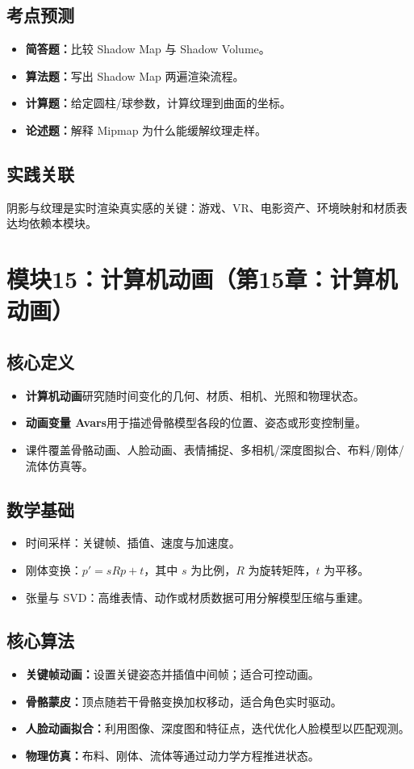 \documentclass[UTF8,fontset=fandol,11pt]{ctexart}
\newcommand{\key}[1]{\textbf{#1}}
\newcommand{\exam}[1]{\textcolor{blue!55!black}{\textbf{#1}}}
\begin{document}
\subsection{考点预测}
\begin{itemize}
  \item \exam{简答题：}比较 Shadow Map 与 Shadow Volume。
  \item \exam{算法题：}写出 Shadow Map 两遍渲染流程。
  \item \exam{计算题：}给定圆柱/球参数，计算纹理到曲面的坐标。
  \item \exam{论述题：}解释 Mipmap 为什么能缓解纹理走样。
\end{itemize}
\subsection{实践关联}
阴影与纹理是实时渲染真实感的关键：游戏、VR、电影资产、环境映射和材质表达均依赖本模块。

\section{模块15：计算机动画（第15章：计算机动画）}
\subsection{核心定义}
\begin{itemize}
  \item \key{计算机动画}研究随时间变化的几何、材质、相机、光照和物理状态。
  \item \key{动画变量 Avars}用于描述骨骼模型各段的位置、姿态或形变控制量。
  \item 课件覆盖骨骼动画、人脸动画、表情捕捉、多相机/深度图拟合、布料/刚体/流体仿真等。
\end{itemize}
\subsection{数学基础}
\begin{itemize}
  \item 时间采样：关键帧、插值、速度与加速度。
  \item 刚体变换：$p'=sRp+t$，其中 $s$ 为比例，$R$ 为旋转矩阵，$t$ 为平移。
  \item 张量与 SVD：高维表情、动作或材质数据可用分解模型压缩与重建。
\end{itemize}
\subsection{核心算法}
\begin{itemize}
  \item \key{关键帧动画：}设置关键姿态并插值中间帧；适合可控动画。
  \item \key{骨骼蒙皮：}顶点随若干骨骼变换加权移动，适合角色实时驱动。
  \item \key{人脸动画拟合：}利用图像、深度图和特征点，迭代优化人脸模型以匹配观测。
  \item \key{物理仿真：}布料、刚体、流体等通过动力学方程推进状态。
\end{itemize}
\end{document}
